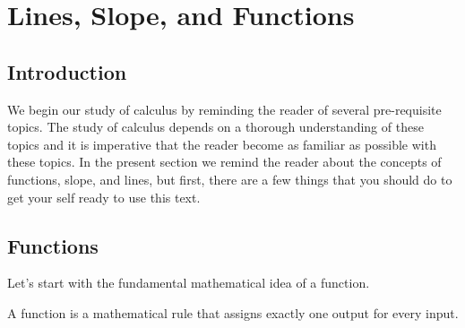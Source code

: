 \section{Lines, Slope, and Functions} \label{S:0.1.Functions}


\vspace*{-14 pt}


\nin \hrulefill



\subsection*{Introduction}
We begin our study of calculus by reminding the reader of several pre-requisite topics.
The study of calculus depends on a thorough understanding of these topics and it is
imperative that the reader become as familiar as possible with these topics.  In the
present section we remind the reader about the concepts of functions, slope, and lines,
but first, there are a few things that you should do to get your self ready to use this
text.



\subsection*{Functions}
Let's start with the fundamental mathematical idea of a function.  
\begin{definition}[Function]
    A function is a mathematical rule that assigns exactly one output for every
    input.  
\end{definition}

